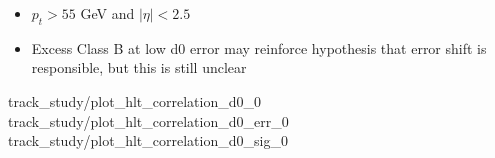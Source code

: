 
    { \begin{itemize}
        \item $p_t > 55$ GeV and $|\eta| < 2.5$
        \item Excess Class B at low d0 error may reinforce hypothesis that error shift is responsible,
            but this is still unclear
    \end{itemize} }
    {track_study/plot_hlt_correlation_d0_0}
    {track_study/plot_hlt_correlation_d0_err_0}
    {track_study/plot_hlt_correlation_d0_sig_0}
